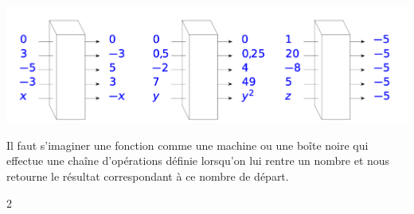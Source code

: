 \documentclass[a4paper,11pt]{report}
\begin{document}
{\begin{center}
\end{center}
\bigskip
\begin{center}
\includegraphics[width=1\textwidth]{media/FA-30/bn2.pdf}
\end{center}

\smallskip

Il faut s'imaginer une fonction comme une machine ou une boîte noire qui  effectue une chaîne d'opérations définie lorsqu'on lui rentre un nombre et nous retourne le résultat correspondant à ce nombre de départ.
}
{2}

\newpage
\end{document}
